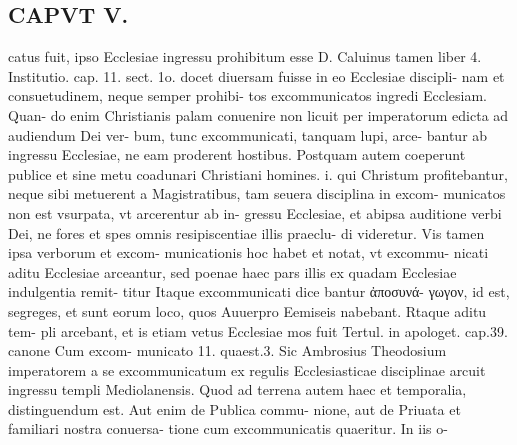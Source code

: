 \documentclass{article}
\begin{document}
\begin{pages}
\section*{CAPVT  V. }\pstart catus fuit, ipso Ecclesiae ingressu prohibitum esse D. Caluinus tamen liber  4. Institutio. cap. 11. sect. 1o. docet diuersam fuisse in eo Ecclesiae discipli- nam et consuetudinem, neque semper prohibi- tos excommunicatos ingredi Ecclesiam. Quan- do enim Christianis palam conuenire non licuit per imperatorum edicta ad audiendum Dei ver- bum, tunc excommunicati, tanquam lupi, arce- bantur ab ingressu Ecclesiae, ne eam proderent hostibus. Postquam autem coeperunt publice et sine metu coadunari Christiani homines. i. qui Christum profitebantur, neque sibi metuerent a Magistratibus, tam seuera disciplina in excom- municatos non est vsurpata, vt arcerentur ab in- gressu Ecclesiae, et abipsa auditione verbi Dei, ne fores et spes omnis resipiscentiae illis praeclu- di videretur. Vis tamen ipsa verborum et excom- municationis hoc habet et notat, vt excommu- nicati aditu Ecclesiae arceantur, sed poenae haec pars illis ex quadam Ecclesiae indulgentia remit- titur Itaque excommunicati dice bantur ἀποσυνά- γωγον, id est, segreges, et sunt eorum loco, quos Auuerpro Eemiseis nabebant. Rtaque aditu tem- pli arcebant, et is etiam vetus Ecclesiae mos fuit Tertul. in apologet. cap.39. canone Cum excom- municato 11. quaest.3. Sic Ambrosius Theodosium imperatorem a se excommunicatum ex regulis Ecclesiasticae disciplinae arcuit ingressu templi Mediolanensis.  \pend\pstart Quod ad terrena autem haec et temporalia, distinguendum est. Aut enim de Publica commu- nione, aut de Priuata et familiari nostra conuersa- tione cum excommunicatis quaeritur. In iis o-  \pend

\end{pages}
\end{document}
